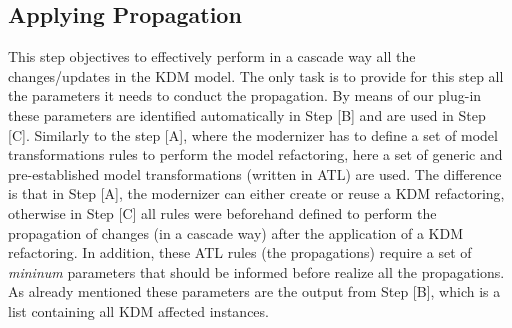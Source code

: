 


\subsection{Applying Propagation} %
\label{sub:apply_refactoring}

This step objectives to effectively perform in a cascade way all the changes/updates in the KDM model. 
%
The only task is to provide for this step all the parameters it needs to conduct the propagation. By means of our plug-in these parameters are identified automatically in Step [B] and are used in Step [C]. 
%
%
Similarly to the step [A], where the modernizer has to define a set of model transformations rules to perform the model refactoring, here a set of generic and pre-established model transformations (written in ATL) are used. The difference is that in Step [A], the modernizer can either create or reuse a KDM refactoring, otherwise in Step [C] all rules were beforehand defined to perform the propagation of changes (in a cascade way) after the application of a KDM refactoring. In addition, these ATL rules (the propagations) require a set of  \textit{mininum} parameters that should be informed before realize all the propagations. As already mentioned these parameters are the output from Step [B], which is a list containing all KDM affected instances. 

